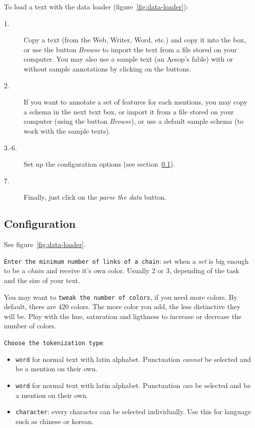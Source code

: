\documentclass[12pt]{article}
\begin{document}
To load a text with the data loader (figure~\ref{fig:data-loader}):
\begin{description}
   \item[1.] Copy a text (from the Web, Writer, Word, etc.) and copy it into the
   box, or use the button \emph{Browse} to import the text from a file stored
   on your computer.  You may also use a sample text (an Aesop's fable) with
   or without sample annotations by clicking on the buttons.
   \item[2.] If you want to annotate a set of features for each mentions, you may
   copy a schema in the next text box, or import it from a
   file stored on your computer (using the button \emph{Browse}), or use a
   default sample schema (to work with the sample texts).
   \item[3.-6.] Set up the configuration options (see
   section~\ref{sec:configuration}).
   \item[7.] Finally, just click on the \emph{parse the data} button.
\end{description}



 \subsection{Configuration}

\label{sec:configuration}

See figure~\ref{fig:data-loader}.

\verb|Enter the minimum number of links of a chain|: set when a \emph{set} is
big enough to be a \emph{chain} and receive it's own color.  Usually 2 or 3,
depending of the task and the size of your text.

You may want to \verb|tweak the number of colors|, if you need more colors.
By default, there are 420 colors.  The more color you add, the less
distinctive they will be.  Play with the hue, saturation and ligthness to
increase or decrease the number of colors.

\verb|Choose the tokenization type|:
\begin{itemize}
   \item \verb|word| for normal text with latin alphabet.  Punctuation
   \emph{cannot} be selected and be a mention on their own.
   \item \verb|word| for normal text with latin alphabet.  Punctuation
   \emph{can} be selected and be a mention on their own.
   \item \verb|character|: every character can be selected individually.  Use
   this for language such as chinese or korean.
\end{itemize}
\end{document}
